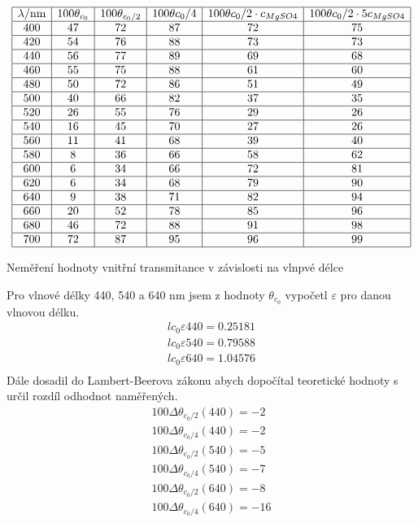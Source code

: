 \documentclass[a4paper,12pt]{article}
\begin{document}
\begin{table}
$$
\begin{array}{|c|c|c|c|c|c|}
\hline
\lambda/\mbox{nm}&   100\theta_{c_0}&   100\theta_{c_0/2}&    100\theta{c_0/4}&    100\theta{c_0/2\cdot c_{MgSO4}}& 100\theta{c_0/2\cdot 5c_{MgSO4}} \\ \hline
400&    47& 72& 87& 72& 75 \\ \hline
420&    54& 76& 88& 73& 73 \\ \hline
440&    56& 77& 89& 69& 68 \\ \hline
460&    55& 75& 88& 61& 60 \\ \hline
480&    50& 72& 86& 51& 49 \\ \hline
500&    40& 66& 82& 37& 35 \\ \hline
520&    26& 55& 76& 29& 26 \\ \hline
540&    16& 45& 70& 27& 26 \\ \hline
560&    11& 41& 68& 39& 40 \\ \hline
580&    8&  36& 66& 58& 62 \\ \hline
600&    6&  34& 66& 72& 81 \\ \hline
620&    6&  34& 68& 79& 90 \\ \hline
640&    9&  38& 71& 82& 94 \\ \hline
660&    20& 52& 78& 85& 96 \\ \hline
680&    46& 72& 88& 91& 98 \\ \hline
700&    72& 87& 95& 96& 99 \\ \hline
\end{array}
$$
\caption{Neměření hodnoty vnitřní transmitance v závislosti na vlnpvé délce}
\label{TM}
\end{table}

Pro vlnové délky 440, 540 a 640 nm jsem z hodnoty $\theta_{c_0}$ vypočetl $\varepsilon$ 
pro danou vlnovou délku.
\begin{eqnarray}
lc_0\varepsilon{440}=0.25181 \\
lc_0\varepsilon{540}=0.79588\\
lc_0\varepsilon{640}=1.04576\\
\end{eqnarray}
Dále dosadil do Lambert-Beerova zákonu abych dopočítal teoretické hodnoty s určil rozdíl odhodnot naměřených.
\begin{eqnarray}
100\Delta\theta_{c_0/2}(440)=-2 \\
100\Delta\theta_{c_0/4}(440)=-2 \\
100\Delta\theta_{c_0/2}(540)=-5 \\
100\Delta\theta_{c_0/4}(540)=-7 \\
100\Delta\theta_{c_0/2}(640)=-8 \\
100\Delta\theta_{c_0/4}(640)=-16 \\
\end{eqnarray}
\end{document}
